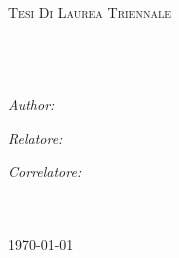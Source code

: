 \documentclass[11pt, oneside]{Thesis} %
\begin{document}
\begin{titlepage}
\begin{center}

\textsc{\LARGE \univname}\\[1.5cm] %
\textsc{\Large Tesi Di Laurea Triennale}\\[0.5cm] %

\HRule \\[0.4cm] %
{\huge \bfseries \ttitle}\\[0.4cm] %
\HRule \\[1.5cm] %
 
\begin{minipage}{0.4\textwidth}

\begin{flushleft} \large
\emph{Author:}\\
\authornames             %
\end{flushleft}
\end{minipage}
\begin{minipage}{0.4\textwidth}
\begin{flushright} \large
\emph{Relatore:} \\
\supname		 %

\emph{Correlatore:} \\
\cosupname		 %
\end{flushright}
\end{minipage}\\[3cm]
 
\deptname\\[2cm] %
 
{\large \today}\\[4cm] %
 
\vfill
\end{center}

\end{titlepage}
  

\clearpage %
\end{document}
